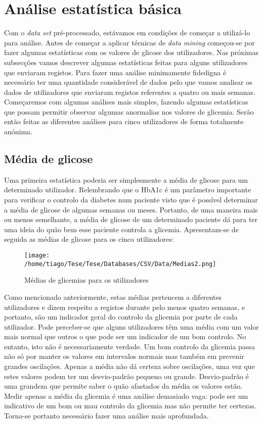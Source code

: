 \section{Análise estatística básica}

Com o \textit{data set} pré-processado, estávamos em condições de começar a utilizá-lo para análise. Antes de começar a aplicar técnicas de \textit{data mining} começou-se por fazer algumas estatísticas com os valores de glicose dos utilizadores. Nas próximas subsecções vamos descrever algumas estatísticas feitas para alguns utilizadores que enviaram registos. Para fazer uma análise minimamente fidedigna é necessário ter uma quantidade considerável de dados pelo que vamos analisar os dados de utilizadores que enviaram registos referentes a quatro ou mais semanas. Começaremos com algumas análises mais simples, fazendo algumas estatísticas que possam permitir observar algumas anormalias nos valores de glicemia. Serão então feitas as diferentes análises para cinco utilizadores de forma totalmente anónima.


\subsection{Média de glicose}

Uma primeira estatística poderia ser simplesmente a média de glicose para um determinado utilizador. Relembrando que o HbA1c é um parâmetro importante para verificar o controlo da diabetes num paciente visto que é possível determinar a média de glicose de algumas semanas ou meses. Portanto, de uma maneira mais ou menos semelhante, a média de glicose de um determinado paciente dá para ter uma ideia do quão bem esse paciente controla a glicemia. Apresentam-se de seguida as médias de glicose para os cinco utilizadores:

\begin{figure}[H]
\centering
\texttt{[image: /home/tiago/Tese/Tese/Databases/CSV/Data/Medias2.png]}
\caption{Médias de glicemias para os utilizadores}
\label{fig:medias1}
\end{figure}
Como mencionado anteriormente, estas médias pertencem a diferentes utilizadores e dizem respeito a registos durante pelo menos quatro semanas, e portanto, são um indicador geral do controlo da glicemia por parte de cada utilizador. Pode perceber-se que alguns utilizadores têm uma média com um valor mais normal que outros o que pode ser um indicador de um bom controlo. No entanto, isto não é necessariamente verdade. Um bom controlo da glicemia passa não só por manter os valores em intervalos normais mas também em prevenir grandes oscilações. Apenas a média não dá certeza sobre oscilações, uma vez que estes valores podem ter um desvio-padrão pequeno ou grande. Desvio-padrão é uma grandeza que permite saber o quão afastados da média os valores estão.
 Medir apenas a média da glicemia é uma análise demasiado vaga: pode ser um indicativo de um bom ou mau controlo da glicemia mas não permite ter certezas. Torna-se portanto necessário fazer uma análise mais aprofundada.



